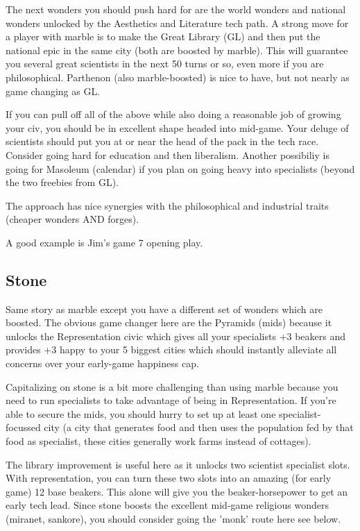 \documentclass[10pt]{article}
\begin{document}
The next wonders you should push hard for are the world wonders and
national wonders unlocked by the Aesthetics and Literature tech
path. A strong move for a player with marble is to make the Great
Library (GL) and then put the national epic in the same city (both are
boosted by marble). This will guarantee you several great scientists
in the next 50 turns or so, even more if you are
philosophical. Parthenon (also marble-boosted) is nice to have, but
not nearly as game changing as GL.

If you can pull off all of the above while also doing a reasonable job
of growing your civ, you should be in excellent shape headed into
mid-game. Your deluge of scientists should put you at or near the head
of the pack in the tech race. Consider going hard for education and
then liberalism. Another possibiliy is going for Masoleum (calendar)
if you plan on going heavy into specialists (beyond the two freebies
from GL).

The approach has nice synergies with the philosophical and industrial traits (cheaper wonders AND forges).

A good example is Jim's game 7 opening play.

\subsection*{Stone}

Same story as marble except you have a different set of wonders which
are boosted. The obvious game changer here are the Pyramids (mids)
because it unlocks the Representation civic which gives all your
specialists +3 beakers and provides +3 happy to your 5 biggest cities
which should instantly alleviate all concerns over your early-game
happiness cap.

Capitalizing on stone is a bit more challenging than using marble
because you need to run specialists to take advantage of being in
Representation. If you're able to secure the mids, you should hurry to
set up at least one specialist-focussed city (a city that generates
food and then uses the population fed by that food as specialist,
these cities generally work farms instead of cottages).

The library improvement is useful here as it unlocks two scientist
specialist slots. With representation, you can turn these two slots
into an amazing (for early game) 12 base beakers. This alone will give
you the beaker-horsepower to get an early tech lead. Since stone
boosts the excellent mid-game religious wonders (miranet, sankore),
you should consider going the 'monk' route here see below.
\end{document}
